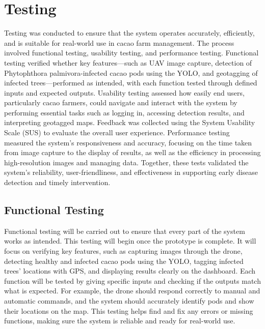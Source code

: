 	\section{Testing} 
	Testing was conducted to ensure that the system operates accurately, efficiently, and is suitable for real-world use in cacao farm management. The process involved functional testing, usability testing, and performance testing. Functional testing verified whether key features—such as UAV image capture, detection of Phytophthora palmivora-infected cacao pods using the YOLO, and geotagging of infected trees—performed as intended, with each function tested through defined inputs and expected outputs. Usability testing assessed how easily end users, particularly cacao farmers, could navigate and interact with the system by performing essential tasks such as logging in, accessing detection results, and interpreting geotagged maps. Feedback was collected using the System Usability Scale (SUS) to evaluate the overall user experience. Performance testing measured the system’s responsiveness and accuracy, focusing on the time taken from image capture to the display of results, as well as the efficiency in processing high-resolution images and managing data. Together, these tests validated the system’s reliability, user-friendliness, and effectiveness in supporting early disease detection and timely intervention.
	
	\subsection{Functional Testing}
	Functional testing will be carried out to ensure that every part of the system works as intended. This testing will begin once the prototype is complete. It will focus on verifying key features, such as capturing images through the drone, detecting healthy and infected cacao pods using the YOLO, tagging infected trees’ locations with GPS, and displaying results clearly on the dashboard. Each function will be tested by giving specific inputs and checking if the outputs match what is expected. For example, the drone should respond correctly to manual and automatic commands, and the system should accurately identify pods and show their locations on the map. This testing helps find and fix any errors or missing functions, making sure the system is reliable and ready for real-world use.
	
